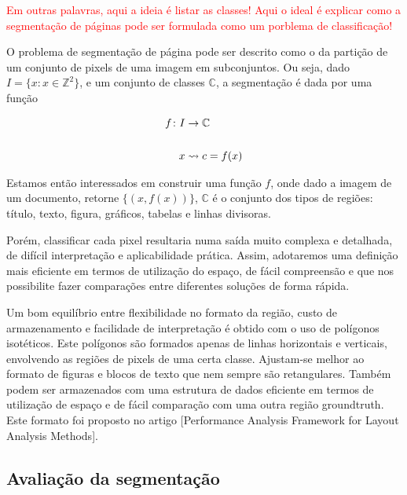 \documentclass[a4paper,11pt]{article}
\newcommand{\TODO}[1]{\textcolor{red}{#1}}
\begin{document}
\TODO{Em outras palavras, aqui a ideia é listar as classes!}
\TODO{Aqui o ideal é explicar como a segmentação de páginas pode ser
  formulada como um porblema de classificação!}


O problema de segmentação de página pode ser descrito como o da
partição de um conjunto de pixels de uma imagem em subconjuntos. Ou
seja, dado $I = \lbrace x \colon x \in \mathbb{Z} ^ 2 \rbrace$, e um
conjunto de classes $\mathbb{C}$, a segmentação é dada por uma função

    \begin{equation}
      \begin{split}
        f \colon I &\to \mathbb{C}\\
        \cr x &\rightsquigarrow c = f(x)
      \end{split}
    \end{equation}


    Estamos então interessados em construir uma função $f$, onde dado
    a imagem de um documento, retorne $\lbrace (x, f(x)) \rbrace$,
    $\mathbb{C}$ é o conjunto dos tipos de regiões: título, texto,
    figura, gráficos, tabelas e linhas divisoras.

    Porém, classificar cada pixel resultaria numa saída muito complexa
    e detalhada, de difícil interpretação e aplicabilidade
    prática. Assim, adotaremos uma definição mais eficiente em termos
    de utilização do espaço, de fácil compreensão e que nos
    possibilite fazer comparações entre diferentes soluções de forma
    rápida.


    Um bom equilíbrio entre flexibilidade no formato da região, custo
    de armazenamento e facilidade de interpretação é obtido com o uso
    de polígonos isotéticos. Este polígonos são formados apenas de
    linhas horizontais e verticais, envolvendo as regiões de pixels de
    uma certa classe. Ajustam-se melhor ao formato de figuras e blocos
    de texto que nem sempre são retangulares. Também podem ser
    armazenados com uma estrutura de dados eficiente em termos de
    utilização de espaço e de fácil comparação com uma outra região
    groundtruth. Este formato foi proposto no artigo [Performance
      Analysis Framework for Layout Analysis Methods].


\subsection{Avaliação da segmentação}
\end{document}
